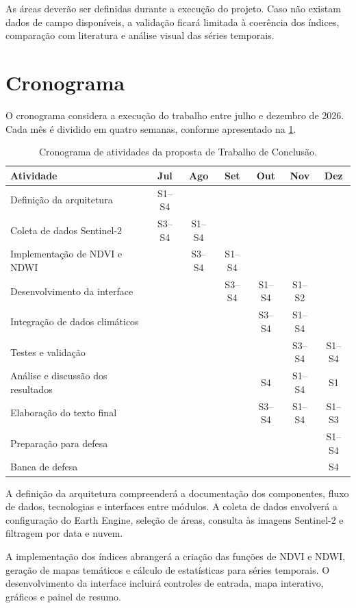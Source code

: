 As áreas deverão ser definidas durante a execução do projeto. Caso não existam dados de campo disponíveis, a validação ficará limitada à coerência dos índices, comparação com literatura e análise visual das séries temporais.

\section{Cronograma}\label{sec:cronograma}

O cronograma considera a execução do trabalho entre julho e dezembro de 2026. Cada mês é dividido em quatro semanas, conforme apresentado na \cref{tab:cronograma}.

\begin{table}[htb!]
\centering
\small
\caption{Cronograma de atividades da proposta de Trabalho de Conclusão.}
\label{tab:cronograma}
\begin{tabular}{|p{5.3cm}|c|c|c|c|c|c|}
\hline
\textbf{Atividade} & \textbf{Jul} & \textbf{Ago} & \textbf{Set} & \textbf{Out} & \textbf{Nov} & \textbf{Dez} \\ \hline
Definição da arquitetura & S1--S4 & & & & & \\ \hline
Coleta de dados Sentinel-2 & S3--S4 & S1--S4 & & & & \\ \hline
Implementação de NDVI e NDWI & & S3--S4 & S1--S4 & & & \\ \hline
Desenvolvimento da interface & & & S3--S4 & S1--S4 & S1--S2 & \\ \hline
Integração de dados climáticos & & & & S3--S4 & S1--S4 & \\ \hline
Testes e validação & & & & & S3--S4 & S1--S4 \\ \hline
Análise e discussão dos resultados & & & & S4 & S1--S4 & S1 \\ \hline
Elaboração do texto final & & & & S3--S4 & S1--S4 & S1--S3 \\ \hline
Preparação para defesa & & & & & & S1--S4 \\ \hline
Banca de defesa & & & & & & S4 \\ \hline
\end{tabular}
\end{table}

A definição da arquitetura compreenderá a documentação dos componentes, fluxo de dados, tecnologias e interfaces entre módulos. A coleta de dados envolverá a configuração do Earth Engine, seleção de áreas, consulta às imagens Sentinel-2 e filtragem por data e nuvem.

A implementação dos índices abrangerá a criação das funções de NDVI e NDWI, geração de mapas temáticos e cálculo de estatísticas para séries temporais. O desenvolvimento da interface incluirá controles de entrada, mapa interativo, gráficos e painel de resumo.

